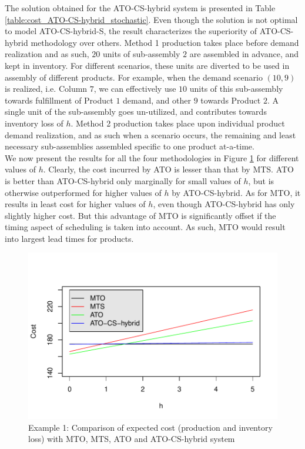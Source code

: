 \documentclass[twoside,onecolumn,12pt,letterpaper]{article}
\begin{document}
The solution obtained for the ATO-CS-hybrid system is presented in Table \ref{table:cost_ATO-CS-hybrid_stochastic}. Even though the solution is not optimal to model ATO-CS-hybrid-S, the result characterizes the superiority of ATO-CS-hybrid methodology over others. Method 1 production takes place before demand realization and as such, $20$ units of sub-assembly $2$ are assembled in advance, and kept in inventory. For different scenarios, these units are diverted to be used in assembly of different products. For example, when the demand scenario $(10,9)$ is realized, i.e. Column $7$, we can effectively use $10$ units of this sub-assembly towards fulfillment of Product $1$ demand, and other $9$ towards Product $2$. A single unit of the sub-assembly goes un-utilized, and contributes towards inventory loss of $h$. Method 2 production takes place upon individual product demand realization, and as such when a scenario occurs, the remaining and least necessary sub-assemblies assembled specific to one product at-a-time. \\

We now present the results for all the four methodologies in Figure \ref{fig:comparison_all_4} for different values of $h$. Clearly, the cost incurred by ATO is lesser than that by MTS. ATO is better than ATO-CS-hybrid only marginally for small values of $h$, but is otherwise outperformed for higher values of $h$ by ATO-CS-hybrid. As for MTO, it results in least cost for higher values of $h$, even though ATO-CS-hybrid has only slightly higher cost. But this advantage of MTO is significantly offset if the timing aspect of scheduling is taken into account. As such, MTO would result into largest lead times for products.
%
\begin{figure}[htbp]
\centering
\includegraphics[width=0.8\linewidth]{comparsion_all_4.pdf}
\caption{Example 1: Comparison of expected cost (production and inventory loss) with MTO, MTS, ATO and ATO-CS-hybrid system}
\label{fig:comparison_all_4}
\end{figure}
\end{document}
